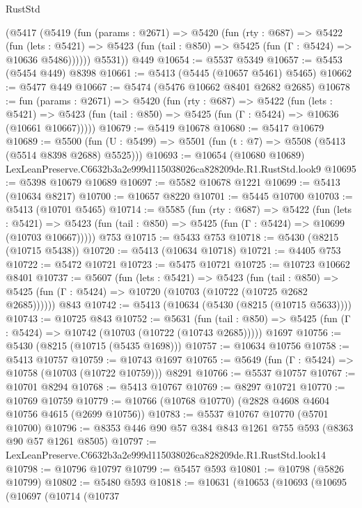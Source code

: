 \begin{lexlean}{RustStd}
\begin{coremodule}
      (@5417
        (@5419
          (fun (params : @2671) =>
          @5420
            (fun (rty : @687) =>
            @5422
              (fun (lets : @5421) =>
              @5423 (fun (tail : @850) => @5425 (fun (Γ : @5424) => @10636 @5486))))))
        @5531))
    @449
@10654 := @5537 @5349
@10657 := @5453 (@5454 @449) @8398
@10661 := @5413 (@5445 (@10657 @5461) @5465)
@10662 := @5477 @449
@10667 := @5474 (@5476 @10662 @8401 @2682 @2685)
@10678 := fun (params : @2671) =>
  @5420
    (fun (rty : @687) =>
    @5422
      (fun (lets : @5421) =>
      @5423 (fun (tail : @850) => @5425 (fun (Γ : @5424) => @10636 (@10661 @10667)))))
@10679 := @5419 @10678
@10680 := @5417 @10679
@10689 := @5500 (fun (U : @5499) => @5501 (fun (t : @7) => @5508 (@5413 (@5514 @8398 @2688) @5525)))
@10693 := @10654 (@10680 @10689) LexLeanPreserve.C6632b3a2e999d115038026ca828209de.R1.RustStd.look9
@10695 := @5398 @10679 @10689
@10697 := @5582 @10678 @1221
@10699 := @5413 (@10634 @8217)
@10700 := @10657 @8220
@10701 := @5445 @10700
@10703 := @5413 (@10701 @5465)
@10714 := @5585
    (fun (rty : @687) =>
    @5422
      (fun (lets : @5421) =>
      @5423 (fun (tail : @850) => @5425 (fun (Γ : @5424) => @10699 (@10703 @10667)))))
    @753
@10715 := @5433 @753
@10718 := @5430 (@8215 (@10715 @5438))
@10720 := @5413 (@10634 @10718)
@10721 := @4405 @753
@10722 := @5472 @10721
@10723 := @5475 @10721
@10725 := @10723 @10662 @8401
@10737 := @5607
    (fun (lets : @5421) =>
    @5423
      (fun (tail : @850) =>
      @5425 (fun (Γ : @5424) => @10720 (@10703 (@10722 (@10725 @2682 @2685))))))
    @843
@10742 := @5413 (@10634 (@5430 (@8215 (@10715 @5633))))
@10743 := @10725 @843
@10752 := @5631
    (fun (tail : @850) => @5425 (fun (Γ : @5424) => @10742 (@10703 (@10722 (@10743 @2685)))))
    @1697
@10756 := @5430 (@8215 (@10715 (@5435 @1698)))
@10757 := @10634 @10756
@10758 := @5413 @10757
@10759 := @10743 @1697
@10765 := @5649 (fun (Γ : @5424) => @10758 (@10703 (@10722 @10759))) @8291
@10766 := @5537 @10757
@10767 := @10701 @8294
@10768 := @5413 @10767
@10769 := @8297 @10721
@10770 := @10769 @10759
@10779 := @10766 (@10768 @10770) (@2828 @4608 @4604 @10756 @4615 (@2699 @10756))
@10783 := @5537 @10767 @10770 (@5701 @10700)
@10796 := @8353 @446 @90 @57 @384 @843 @1261 @755 @593 (@8363 @90 @57 @1261 @8505)
@10797 := LexLeanPreserve.C6632b3a2e999d115038026ca828209de.R1.RustStd.look14
@10798 := @10796 @10797
@10799 := @5457 @593
@10801 := @10798 (@5826 @10799)
@10802 := @5480 @593
@10818 := @10631
    (@10653
      (@10693
        (@10695
          (@10697
            (@10714
              (@10737

\end{coremodule}
\end{lexlean}

